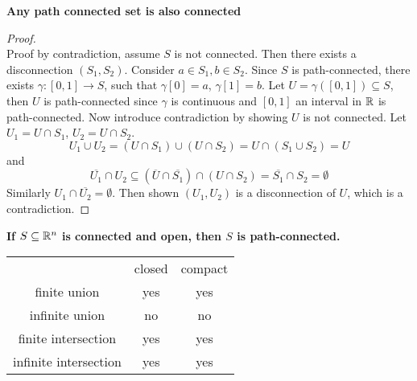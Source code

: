 \documentclass[11pt]{article}
\begin{document}
\begin{theorem}
  \label{Any set which is path connected is also connected}
  \textbf{Any path connected set is also connected}
  \begin{proof}
    $ $\\
    Proof by contradiction, assume $S$ is not connected. Then there exists a disconnection $(S_1, S_2)$.  Consider $a\in S_1, b\in S_2$. Since $S$ is path-connected, there exists $\gamma: [0,1]\rightarrow S$, such that $\gamma[0] = a$, $\gamma[1] = b$. Let $U= \gamma([0,1])\subseteq S$, then $U$ is path-connected since $\gamma$ is continuous and $[0,1]$ an interval in $\mathbb{R}$ is path-connected. Now introduce contradiction by showing $U$ is not connected. Let $U_1 = U\cap S_1$, $U_2 = U\cap S_2$.
    \[
      U_1\cup U_2 = (U\cap S_1)\cup (U\cap S_2) = U\cap (S_1\cup S_2) = U
    \]
    and
    \[
      \overline{U_1}\cap U_2 \subseteq (\overline{U}\cap \overline{S_1})\cap (U\cap S_2) = \overline{S_1}\cap S_2 = \emptyset
    \]
    Similarly $U_1\cap \overline{U_2}=\emptyset$. Then shown $(U_1, U_2)$ is a disconnection of $U$, which is a contradiction.
  \end{proof}
\end{theorem}


\begin{theorem}
  \label{connected set not necessarily path-connected}
  \textbf{If $S\subseteq \mathbb{R}^n$ is connected and open, then $S$ is path-connected.}
\end{theorem}



\begin{center}
  \begin{tabular}{ c c c }
                           & closed   & compact \\
     finite union          & yes      & yes  \\
     infinite union        & no       & no  \\
     finite intersection   & yes      & yes \\
     infinite intersection & yes      & yes \\
  \end{tabular}
\end{center}
\end{document}
